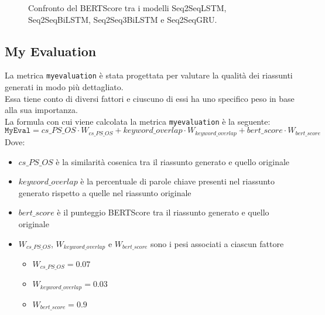 \begin{figure}[H]
    \centering
    \hfill
    \hfill
    \hfill
    \hfill

    \caption{Confronto del BERTScore tra i modelli Seq2SeqLSTM, Seq2SeqBiLSTM, Seq2Seq3BiLSTM e Seq2SeqGRU.}
    \label{fig:bert_score_comparison}
\end{figure}

\subsection{My Evaluation}
La metrica \texttt{myevaluation} \`e stata progettata per valutare la qualit\`a dei riassunti generati in modo pi\`u dettagliato.\\
Essa tiene conto di diversi fattori e ciuscuno di essi ha uno specifico peso in base alla sua importanza.\\
La formula con cui viene calcolata la metrica \texttt{myevaluation} \`e la seguente:
\[
    \texttt{MyEval} = cs\_PS\_OS \cdot W_{cs\_PS\_OS} + keyword\_overlap \cdot W_{keyword\_overlap} + bert\_score \cdot W_{bert\_score}
\]
Dove:
\begin{itemize}
    \item $cs\_PS\_OS$ \`e la similarit\`a cosenica tra il riassunto generato e quello originale
    \item $keyword\_overlap$ \`e la percentuale di parole chiave presenti nel riassunto generato rispetto a quelle nel riassunto originale
    \item $bert\_score$ \`e il punteggio BERTScore tra il riassunto generato e quello originale
    \item $W_{cs\_PS\_OS}$, $W_{keyword\_overlap}$ e $W_{bert\_score}$ sono i pesi associati a ciascun fattore
          \begin{itemize}
              \item $W_{cs\_PS\_OS} = 0.07$
              \item $W_{keyword\_overlap} = 0.03$
              \item $W_{bert\_score} = 0.9$
          \end{itemize}
\end{itemize}

